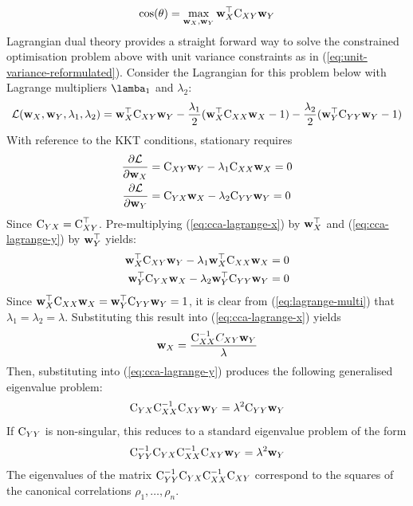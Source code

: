 \begin{equation}
\cos(\theta) = \max_{{\mathbf{w}}_X, {\mathbf{w}}_Y} {\mathbf{w}}_X^\top {\textrm{C}}_{XY} {\mathbf{w}}_Y 
\end{equation}
Lagrangian dual theory provides a straight forward way to solve the constrained optimisation problem above with unit variance constraints as in (\ref{eq:unit-variance-reformulated}). Consider the Lagrangian for this problem below with Lagrange multipliers $\lamba_1$ and $\lambda_2$:
\begin{equation}
    \mathcal{L}({\mathbf{w}}_X, {\mathbf{w}}_Y, \lambda_1, \lambda_2) = {\mathbf{w}}_X^\top {\textrm{C}}_{XY} {\mathbf{w}}_Y - \frac{\lambda_1}{2}({\mathbf{w}}_X^\top {\textrm{C}}_{XX} {\mathbf{w}}_X-1) - \frac{\lambda_2}{2}({\mathbf{w}}_Y^\top {\textrm{C}}_{YY} {\mathbf{w}}_Y-1)
\end{equation}
With reference to the KKT conditions, stationary requires
\begin{align}
    \label{eq:cca-lagrange-x}
    \frac{\partial \mathcal{L}}{\partial {\mathbf{w}}_X} &= {\textrm{C}}_{XY} {\mathbf{w}}_Y - \lambda_1{\textrm{C}}_{XX} {\mathbf{w}}_X = 0 \\
    \frac{\partial \mathcal{L}}{\partial {\mathbf{w}}_Y} &= {\textrm{C}}_{YX} {\mathbf{w}}_X - \lambda_2{\textrm{C}}_{YY} {\mathbf{w}}_Y = 0
        \label{eq:cca-lagrange-y}
\end{align}
Since ${\textrm{C}}_{YX} = {\textrm{C}}_{XY}^\top$. Pre-multiplying (\ref{eq:cca-lagrange-x}) by ${\mathbf{w}}_X^\top$ and (\ref{eq:cca-lagrange-y}) by ${\mathbf{w}}_Y^\top$ yields:
\begin{align}
\begin{split}
    {\mathbf{w}}_X^\top{\textrm{C}}_{XY} {\mathbf{w}}_Y - \lambda_1{\mathbf{w}}_X^\top{\textrm{C}}_{XX} {\mathbf{w}}_X &= 0 \\
    {\mathbf{w}}_Y^\top{\textrm{C}}_{YX} {\mathbf{w}}_X - \lambda_2{\mathbf{w}}_Y^\top{\textrm{C}}_{YY} {\mathbf{w}}_Y &= 0
\end{split}
\label{eq:lagrange-multi}
\end{align}
Since ${\mathbf{w}}_X^\top {\textrm{C}}_{XX} {\mathbf{w}}_X = {\mathbf{w}}_Y^\top {\textrm{C}}_{YY} {\mathbf{w}}_Y =1$, it is clear from (\ref{eq:lagrange-multi}) that $\lambda_1=\lambda_2 = \lambda$. Substituting this result into (\ref{eq:cca-lagrange-x}) yields
\begin{align}
    {\mathbf{w}}_X = \frac{{\textrm{C}}_{XX}^{-1}C_{XY}{\mathbf{w}}_Y}{\lambda}
\end{align}
Then, substituting into (\ref{eq:cca-lagrange-y}) produces the following generalised eigenvalue problem:
\begin{align}
    {\textrm{C}}_{YX}{\textrm{C}}^{-1}_{XX}{\textrm{C}}_{XY}{\mathbf{w}}_{Y} = \lambda^2{\textrm{C}}_{YY}{\mathbf{w}}_Y
\end{align}
If ${\textrm{C}}_{YY}$ is non-singular, this reduces to a standard eigenvalue problem of the form
\begin{align}
    {\textrm{C}}_{YY}^{-1}{\textrm{C}}_{YX}{\textrm{C}}^{-1}_{XX}{\textrm{C}}_{XY}{\mathbf{w}}_{Y} = \lambda^2{\mathbf{w}}_Y
\end{align}
The eigenvalues of the matrix ${\textrm{C}}_{YY}^{-1}{\textrm{C}}_{YX}{\textrm{C}}^{-1}_{XX}{\textrm{C}}_{XY}$ correspond to the squares of the canonical correlations $\rho_1, \dots, \rho_n$.

